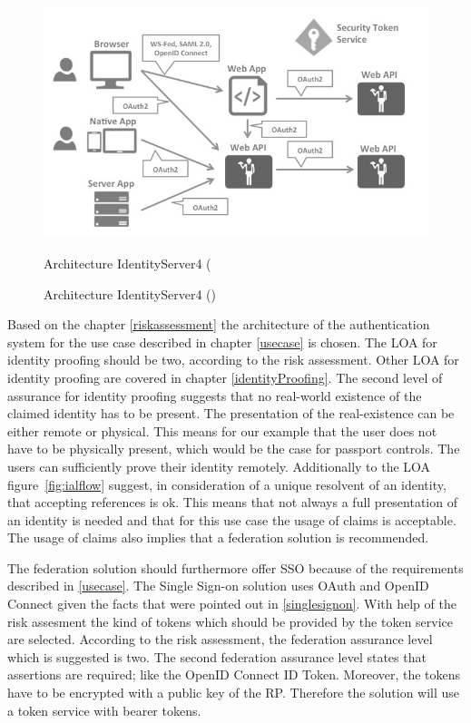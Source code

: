   \begin{figure}[h]
 	\centering
 	\includegraphics[width=0.9\linewidth]{images/architecture-identityserver}
 	\caption[Architecture IdentityServer4]{Architecture IdentityServer4 (\cite{Brock:2018:ID4}}
 	\caption{Architecture IdentityServer4 (\cite{Brock:2018:ID4})}
 	\label{fig:architecture-identityserver}
 \end{figure}

 Based on the chapter \ref{riskassessment} the architecture of the authentication system for the use case described in chapter \ref{usecase} is chosen. The LOA for identity proofing should be two, according to the risk assessment. Other LOA for identity proofing are covered in chapter \ref{identityProofing}. The second level of assurance for identity proofing suggests that no real-world existence of the claimed identity has to be present. The presentation of the real-existence can be either remote or physical. This means for our example that the user does not have to be physically present, which would be the case for passport controls. The users can sufficiently prove their identity remotely. Additionally to the LOA figure~\ref{fig:ialflow} suggest, in consideration of a unique resolvent of an identity, that accepting references is ok. This means that not always a full presentation of an identity is needed and that for this use case the usage of claims is acceptable. The usage of claims also implies that a federation solution is recommended. 
 
 The federation solution should furthermore offer SSO because of the requirements described in \ref{usecase}. The Single Sign-on solution uses OAuth and OpenID Connect given the facts that were pointed out in \ref{singlesignon}. With help of the risk assesment the kind of tokens which should be provided by the token service are selected. According to the risk assessment, the federation assurance level which is suggested is two. The second federation assurance level states that assertions are required; like the OpenID Connect ID Token. Moreover, the tokens have to be encrypted with a public key of the RP. Therefore the solution will use a token service with bearer tokens.
 

